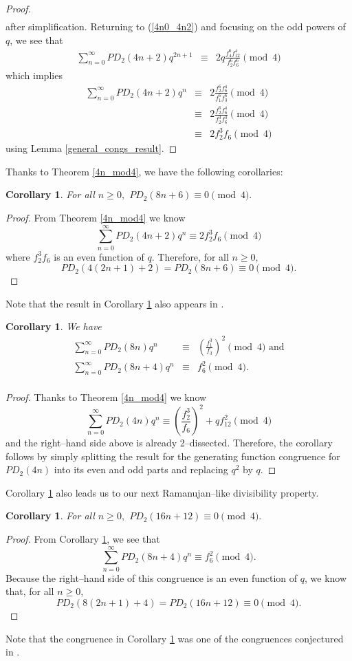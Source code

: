 \documentclass{amsart}
\newtheorem{corollary}[theorem]{Corollary}
\begin{document}
\begin{proof}
\begin{eqnarray*}
\end{eqnarray*}
after simplification.  Returning to (\ref{4n0_4n2}) and focusing on the odd powers of $q$, we see that 
\begin{eqnarray*}
 \sum_{n=0}^{\infty} PD_2(4n+2)q^{2n+1} 
 &\equiv & 2q\frac{f_4^6f_{12}^4}{f_2^6f_6^6} \pmod{4}
 \end{eqnarray*}
which implies 
\begin{eqnarray*}
 \sum_{n=0}^{\infty} PD_2(4n+2)q^{n} 
 &\equiv & 2\frac{f_2^6f_{6}^4}{f_1^6f_3^6} \pmod{4} \\
 &\equiv & 2\frac{f_2^6f_{6}^4}{f_2^3f_6^3} \pmod{4} \\
 &\equiv & 2f_2^3f_6 \pmod{4}
 \end{eqnarray*}
using Lemma \ref{general_congs_result}.  
\end{proof}
Thanks to Theorem \ref{4n_mod4}, we have the following corollaries:  
\begin{corollary}
\label{8n6_mod4}
For all $n\geq 0,$ $PD_2(8n+6) \equiv 0\pmod{4}.$
\end{corollary}
\begin{proof}
From Theorem \ref{4n_mod4} we know 
$$\sum_{n=0}^{\infty} PD_2(4n+2)q^n \equiv 2f_2^3f_6 \pmod{4}$$ where $f_2^3f_6$ is an even function of $q.$  Therefore, for all $n\geq 0,$ 
$$
PD_2(4(2n+1)+2) = PD_2(8n+6) \equiv 0 \pmod{4}.
$$    
\end{proof}
Note that the result in Corollary \ref{8n6_mod4} also appears in \cite[Theorem 1.5]{BO}.  
\begin{corollary}
\label{8n0_8n4_mod4}   
We have 
\begin{eqnarray*}
\sum_{n=0}^{\infty} PD_2(8n)q^n & \equiv &  \left(\frac{f_1^3}{f_3}\right)^2 \pmod{4}  \textrm{\ \ \ and}
 \\
\sum_{n=0}^{\infty} PD_2(8n+4)q^n & \equiv & f_{6}^2 \pmod{4}.\\
\end{eqnarray*}
\end{corollary}
\begin{proof}
Thanks to Theorem \ref{4n_mod4}
we know  
$$
\sum_{n=0}^{\infty} PD_2(4n)q^n  \equiv  \left(\frac{f_2^3}{f_6}\right)^2 +qf_{12}^2 \pmod{4}  
$$
and the right--hand side above is already 2--dissected.  Therefore, the corollary follows by simply splitting the result for the generating function congruence for $PD_2(4n)$ into its even and odd parts and replacing $q^2$ by $q$. 
\end{proof}
Corollary \ref{8n0_8n4_mod4} also leads us to our next Ramanujan--like divisibility property.  
\begin{corollary}
\label{16n12_mod4}
For all $n\geq 0,$ $PD_2(16n+12) \equiv 0 \pmod{4}.$
\end{corollary}
\begin{proof}
From Corollary \ref{8n0_8n4_mod4}, we see that 
$$
\sum_{n=0}^{\infty} PD_2(8n+4)q^n  \equiv f_{6}^2 \pmod{4}.
$$
Because the right--hand side of this congruence is an even function of $q$, we know that, for all $n\geq 0$,  
$$
PD_2(8(2n+1)+4) = PD_2(16n+12)\equiv 0 \pmod{4}.
$$
\end{proof}
Note that the congruence in Corollary \ref{16n12_mod4} was one of the congruences conjectured in \cite{Her}.  
\end{document}

